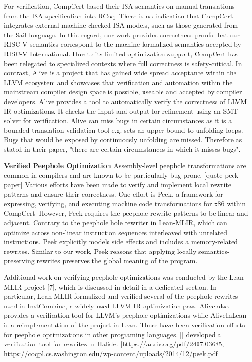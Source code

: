 For verification, CompCert based their ISA semantics on manual translations from the ISA specification into RCoq. There is no indication that CompCert integrates external machine-checked ISA models, such as those generated from the Sail language. In this regard, our work provides correctness proofs that our RISC-V semantics correspond to the machine-formalized semantics accepted by RISC-V International. Due to its limited optimization support, CompCert has been relegated to specialized contexts where full correctness is safety-critical. In contrast, Alive is a project that has gained wide spread acceptance within the LLVM ecosystem and showcases that verification and automation within the mainstream compiler design space is possible, useable and accepted by compiler developers. Alive provides a tool to automatically verify the correctness of LLVM IR optimizations. It checks the input and output for refinement using an SMT solver for verification. Alive can miss bugs in certain circumstances as it is a bounded translation validation tool e.g. sets an upper bound to unfolding loops. Bugs that would be exposed by continuously unfolding are missed. Therefore as stated in their paper, "there are certain circumstances in which it misses bugs". 

\textbf{Verified Peephole Optimization}
Assembly-level peephole transformations are common in compilers and are known to be particularly bug-prone. [quote peek paper] Various efforts have been made to verify and implement local rewrite patterns and ensure their correctness. One effort is Peek, a framework for expressing, verifying, and executing machine code transformations for x86 within CompCert. However, Peek requires the peephole rewrite patterns to be linear and adjacent. Contrary to the peephole hole rewriter in Lean-MLIR, which can optimize across non-linear instruction sequences interleaved with unrelated instructions. Peek explicitly models side effects and includes a memory-related rewrites. Similar to our work, Peek reasons that applying locally semantics-preserving rewrites preserves the global meaning of the program.

Additional work on verifying peephole optimizations was conducted by the Lean-MLIR project [7], which is discussed in detail in a dedicated section. In particular, Lean-MLIR formalized and verified several of the peephole rewrites used in InstCombine, a widely-used LLVM IR optimization pass. Alive also provides a verification tool for LLVM's peephole optimizations while AliveInLean is a reimplementation of the project in Lean. There have been verification efforts for peephole optimizations in other programing languages.  [] developed a verification tool for rewrites in Halide. 
[https://arxiv.org/pdf/2407.03685,
https://coqpl.cs.washington.edu/wp-content/uploads/2014/12/peek.pdf
]

